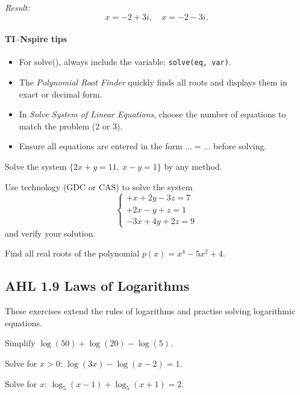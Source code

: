 \documentclass[11pt]{article}
\def\texttt#1{#1}%
\newcommand{\tocsubsection}[1]{\subsection{#1}}
\newcounter{question}
\begin{document}
\emph{Result:}
\[
\boxed{x = -2 + 3i,\quad x = -2 - 3i}.
\]

\paragraph{TI–Nspire tips}
\begin{itemize}[itemsep=1pt]
  \item For \texttt{solve()}, always include the variable: \verb|solve(eq, var)|.
  \item The \emph{Polynomial Root Finder} quickly finds all roots and displays them in exact or decimal form.
  \item In \emph{Solve System of Linear Equations}, choose the number of equations to match the problem (2 or 3).
  \item Ensure all equations are entered in the form \( \dots = \dots \) before solving.
\end{itemize}


\begin{question}
Solve the system $\{2x+y=11,\ x-y=1\}$ by any method.
\end{question}

\begin{question}
Use technology (GDC or CAS) to solve the system
\[\begin{cases}
+x+2y-3z=7\\
+2x-y+z=1\\
-3x+4y+2z=9
\end{cases}\]
and verify your solution.
\end{question}

\begin{question}
Find all real roots of the polynomial $p(x)=x^4-5x^2+4$.
\end{question}

\tocsubsection{AHL  1.9  \; Laws  of  Logarithms}
These exercises extend the rules of logarithms and practise solving logarithmic
equations.

\begin{question}
Simplify $\log(50)+\log(20)-\log(5)$.
\end{question}

\begin{question}
Solve for $x>0$: $\log(3x)-\log(x-2)=1$.
\end{question}

\begin{question}
Solve for $x$: $\log_5(x-1)+\log_5(x+1)=2$.
\end{question}
\end{document}
